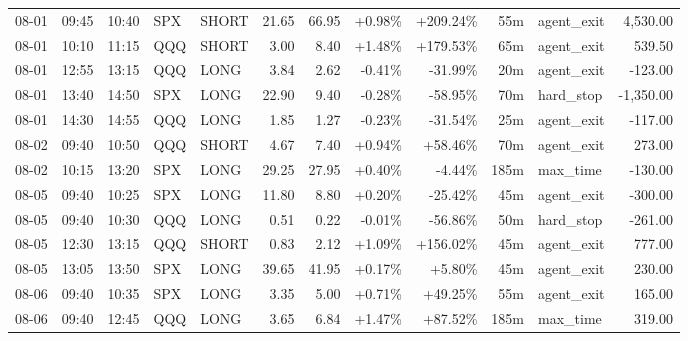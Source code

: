 \documentclass[11pt,a4paper,twoside]{article}
\begin{document}
\begin{center}
\begin{longtable}{>{\color{txtmain}}l l l l l r r r r r >{\color{txtmain}}l r}
08-01 & 09:45 & 10:40 & SPX & SHORT & 21.65 & 66.95 & \textcolor{wingreen}{+0.98\%} & \textcolor{wingreen}{+209.24\%} & 55m & agent\_exit & \textcolor{wingreen}{4,530.00} \\
08-01 & 10:10 & 11:15 & QQQ & SHORT & 3.00 & 8.40 & \textcolor{wingreen}{+1.48\%} & \textcolor{wingreen}{+179.53\%} & 65m & agent\_exit & \textcolor{wingreen}{539.50} \\
08-01 & 12:55 & 13:15 & QQQ & LONG & 3.84 & 2.62 & \textcolor{lossred}{-0.41\%} & \textcolor{lossred}{-31.99\%} & 20m & agent\_exit & \textcolor{lossred}{-123.00} \\
08-01 & 13:40 & 14:50 & SPX & LONG & 22.90 & 9.40 & \textcolor{lossred}{-0.28\%} & \textcolor{lossred}{-58.95\%} & 70m & hard\_stop & \textcolor{lossred}{-1,350.00} \\
08-01 & 14:30 & 14:55 & QQQ & LONG & 1.85 & 1.27 & \textcolor{lossred}{-0.23\%} & \textcolor{lossred}{-31.54\%} & 25m & agent\_exit & \textcolor{lossred}{-117.00} \\
08-02 & 09:40 & 10:50 & QQQ & SHORT & 4.67 & 7.40 & \textcolor{wingreen}{+0.94\%} & \textcolor{wingreen}{+58.46\%} & 70m & agent\_exit & \textcolor{wingreen}{273.00} \\
08-02 & 10:15 & 13:20 & SPX & LONG & 29.25 & 27.95 & \textcolor{wingreen}{+0.40\%} & \textcolor{lossred}{-4.44\%} & 185m & max\_time & \textcolor{lossred}{-130.00} \\
08-05 & 09:40 & 10:25 & SPX & LONG & 11.80 & 8.80 & \textcolor{wingreen}{+0.20\%} & \textcolor{lossred}{-25.42\%} & 45m & agent\_exit & \textcolor{lossred}{-300.00} \\
08-05 & 09:40 & 10:30 & QQQ & LONG & 0.51 & 0.22 & \textcolor{lossred}{-0.01\%} & \textcolor{lossred}{-56.86\%} & 50m & hard\_stop & \textcolor{lossred}{-261.00} \\
08-05 & 12:30 & 13:15 & QQQ & SHORT & 0.83 & 2.12 & \textcolor{wingreen}{+1.09\%} & \textcolor{wingreen}{+156.02\%} & 45m & agent\_exit & \textcolor{wingreen}{777.00} \\
08-05 & 13:05 & 13:50 & SPX & LONG & 39.65 & 41.95 & \textcolor{wingreen}{+0.17\%} & \textcolor{wingreen}{+5.80\%} & 45m & agent\_exit & \textcolor{wingreen}{230.00} \\
08-06 & 09:40 & 10:35 & SPX & LONG & 3.35 & 5.00 & \textcolor{wingreen}{+0.71\%} & \textcolor{wingreen}{+49.25\%} & 55m & agent\_exit & \textcolor{wingreen}{165.00} \\
08-06 & 09:40 & 12:45 & QQQ & LONG & 3.65 & 6.84 & \textcolor{wingreen}{+1.47\%} & \textcolor{wingreen}{+87.52\%} & 185m & max\_time & \textcolor{wingreen}{319.00} \\

\end{longtable}
\end{center}
\end{document}
